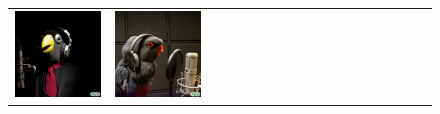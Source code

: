 \begin{figure}[ht!]
\begin{adjustwidth}{-0.8in}{-0.5in}
\begin{tabular}{cccccccccccccccccccc}
\multicolumn{2}{c}{\includegraphics[width=\threebythreecolwidth\textwidth]{figures/cherries/bird_sing5.jpg}} &
\multicolumn{2}{c}{\includegraphics[width=\threebythreecolwidth\textwidth]{figures/cherries/bird_sing6.jpg}} &&

\end{tabular}
\end{adjustwidth}
\end{figure}

